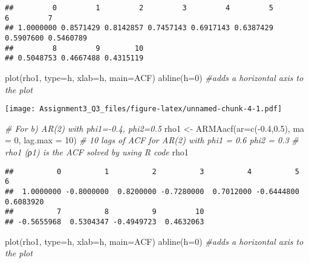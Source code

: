 \documentclass[
]{article}
\newenvironment{Shaded}{\begin{snugshade}}{\end{snugshade}}
\newcommand{\AttributeTok}[1]{\textcolor[rgb]{0.77,0.63,0.00}{#1}}
\newcommand{\CommentTok}[1]{\textcolor[rgb]{0.56,0.35,0.01}{\textit{#1}}}
\newcommand{\DecValTok}[1]{\textcolor[rgb]{0.00,0.00,0.81}{#1}}
\newcommand{\FloatTok}[1]{\textcolor[rgb]{0.00,0.00,0.81}{#1}}
\newcommand{\FunctionTok}[1]{\textcolor[rgb]{0.00,0.00,0.00}{#1}}
\newcommand{\NormalTok}[1]{#1}
\newcommand{\OtherTok}[1]{\textcolor[rgb]{0.56,0.35,0.01}{#1}}
\newcommand{\SpecialCharTok}[1]{\textcolor[rgb]{0.00,0.00,0.00}{#1}}
\newcommand{\StringTok}[1]{\textcolor[rgb]{0.31,0.60,0.02}{#1}}
\begin{document}
\begin{verbatim}
##         0         1         2         3         4         5         6         7 
## 1.0000000 0.8571429 0.8142857 0.7457143 0.6917143 0.6387429 0.5907600 0.5460789 
##         8         9        10 
## 0.5048753 0.4667488 0.4315119
\end{verbatim}

\begin{Shaded}
\begin{Highlighting}[]
\FunctionTok{plot}\NormalTok{(rho1, }\AttributeTok{type=}\StringTok{\textquotesingle{}h\textquotesingle{}}\NormalTok{, }\AttributeTok{xlab=}\StringTok{\textquotesingle{}h\textquotesingle{}}\NormalTok{, }\AttributeTok{main=}\StringTok{\textquotesingle{}ACF\textquotesingle{}}\NormalTok{)}
\FunctionTok{abline}\NormalTok{(}\AttributeTok{h=}\DecValTok{0}\NormalTok{)  }\CommentTok{\#adds a horizontal axis to the plot}
\end{Highlighting}
\end{Shaded}

\texttt{[image: Assignment3\_Q3\_files/figure-latex/unnamed-chunk-4-1.pdf]}

\begin{Shaded}
\begin{Highlighting}[]
\CommentTok{\# For b) AR(2) with phi1={-}0.4, phi2=0.5}
\NormalTok{rho1 }\OtherTok{\textless{}{-}} \FunctionTok{ARMAacf}\NormalTok{(}\AttributeTok{ar=}\FunctionTok{c}\NormalTok{(}\SpecialCharTok{{-}}\FloatTok{0.4}\NormalTok{,}\FloatTok{0.5}\NormalTok{), }\AttributeTok{ma =} \DecValTok{0}\NormalTok{, }\AttributeTok{lag.max =} \DecValTok{10}\NormalTok{) }\CommentTok{\# 10 lags of ACF for AR(2) with phi1 = 0.6 phi2 = 0.3}
\CommentTok{\# rho1 (ρ1) is the ACF solved by using R code}
\NormalTok{rho1}
\end{Highlighting}
\end{Shaded}

\begin{verbatim}
##          0          1          2          3          4          5          6 
##  1.0000000 -0.8000000  0.8200000 -0.7280000  0.7012000 -0.6444800  0.6083920 
##          7          8          9         10 
## -0.5655968  0.5304347 -0.4949723  0.4632063
\end{verbatim}

\begin{Shaded}
\begin{Highlighting}[]
\FunctionTok{plot}\NormalTok{(rho1, }\AttributeTok{type=}\StringTok{\textquotesingle{}h\textquotesingle{}}\NormalTok{, }\AttributeTok{xlab=}\StringTok{\textquotesingle{}h\textquotesingle{}}\NormalTok{, }\AttributeTok{main=}\StringTok{\textquotesingle{}ACF\textquotesingle{}}\NormalTok{)}
\FunctionTok{abline}\NormalTok{(}\AttributeTok{h=}\DecValTok{0}\NormalTok{)  }\CommentTok{\#adds a horizontal axis to the plot}
\end{Highlighting}
\end{Shaded}
\end{document}
